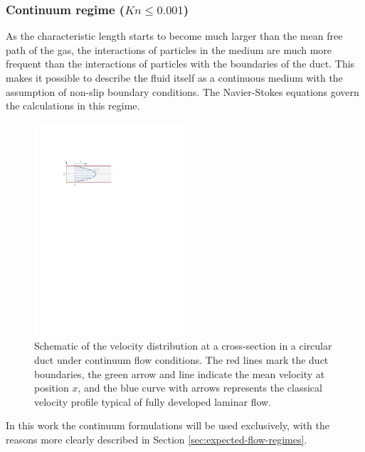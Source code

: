 \subsubsection*{Continuum regime (\(Kn \leq 0.001\))}
	As the characteristic length starts to become much larger than the mean free path of the gas, the interactions of particles in the medium are much more frequent than the interactions of particles with the boundaries of the duct.
	This makes it possible to describe the fluid itself as a continuous medium with the assumption of non-slip boundary conditions.
	The Navier-Stokes equations govern the calculations in this regime.
	\begin{figure}[H]
	    \centering
	    \includegraphics[width=0.5\textwidth]{src/02_foundations/fig_continuum-regime.pdf}
		\caption{
			Schematic of the velocity distribution at a cross-section in a circular duct under continuum flow conditions.
			The red lines mark the duct boundaries, the green arrow and line indicate the mean velocity at position $x$, and the blue curve with arrows represents the classical velocity profile typical of fully developed laminar flow. \cite{Cengel2017}
		}
		\label{fig:non-slip-flow}
	\end{figure}

	In this work the continuum formulations will be used exclusively, with the reasons more clearly described in Section \ref{sec:expected-flow-regimes}.
	\cite{rapp2017microfluidics, putignano2012supersonic, halwidl_development_2016, leishman_internal_2023}
